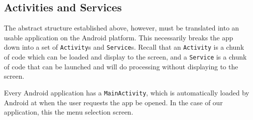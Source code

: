 \subsection{Activities and Services}

The abstract structure established above, however, must be translated into an usable application on the Android platform. This necessarily 
breaks the app down into a set of \verb|Activity|s and \verb|Service|s. Recall that an \verb|Activity| is a chunk of code which can be loaded
and display to the screen, and a \verb|Service| is a chunk of code that can be launched and will do processing without displaying to the 
screen.

Every Android application has a \verb|MainActivity|, which is automatically loaded by Android at when the user requests the app be opened. 
In the case of our application, this the menu selection screen. 

